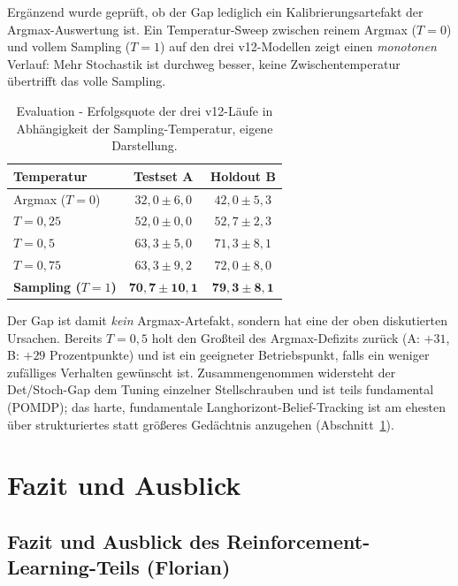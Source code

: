 \documentclass[11pt,a4paper]{article}
\let\sfOldSection\section
\renewcommand{\section}{\clearpage\sfOldSection}
\begin{document}
Ergänzend wurde geprüft, ob der Gap lediglich ein Kalibrierungsartefakt der
Argmax-Auswertung ist. Ein Temperatur-Sweep zwischen reinem Argmax ($T{=}0$)
und vollem Sampling ($T{=}1$) auf den drei v12-Modellen zeigt einen
\emph{monotonen} Verlauf: Mehr Stochastik ist durchweg besser, keine
Zwischentemperatur übertrifft das volle Sampling.

\begin{table}[h]
\centering
\small
\begin{tabular}{@{}lcc@{}}
\toprule
\textbf{Temperatur} & \textbf{Testset A} & \textbf{Holdout B} \\
\midrule
Argmax ($T{=}0$)     & $32{,}0 \pm 6{,}0$ & $42{,}0 \pm 5{,}3$ \\
$T = 0{,}25$         & $52{,}0 \pm 0{,}0$ & $52{,}7 \pm 2{,}3$ \\
$T = 0{,}5$          & $63{,}3 \pm 5{,}0$ & $71{,}3 \pm 8{,}1$ \\
$T = 0{,}75$         & $63{,}3 \pm 9{,}2$ & $72{,}0 \pm 8{,}0$ \\
\textbf{Sampling ($T{=}1$)} & $\mathbf{70{,}7 \pm 10{,}1}$ & $\mathbf{79{,}3 \pm 8{,}1}$ \\
\bottomrule
\end{tabular}
\caption[Temperatur-Sweep der Evaluation]{Evaluation - Erfolgsquote der drei
v12-Läufe in Abhängigkeit der Sampling-Temperatur, eigene Darstellung.}
\label{tab:temperatur}
\end{table}

Der Gap ist damit \emph{kein} Argmax-Artefakt, sondern hat eine der oben
diskutierten Ursachen. Bereits $T{=}0{,}5$ holt den Großteil des
Argmax-Defizits zurück (A: $+31$, B: $+29$ Prozentpunkte) und ist ein
geeigneter Betriebspunkt, falls ein weniger zufälliges Verhalten gewünscht
ist. Zusammengenommen widersteht der Det/Stoch-Gap dem Tuning einzelner
Stellschrauben und ist teils fundamental (POMDP); das harte, fundamentale
Langhorizont-Belief-Tracking ist am ehesten über strukturiertes statt
größeres Gedächtnis anzugehen (Abschnitt~\ref{sec:ausblick}).

\section{Fazit und Ausblick}
\label{sec:ausblick}

\subsection{Fazit und Ausblick des Reinforcement-Learning-Teils (Florian)}
\label{sec:fazitrl}
\end{document}
